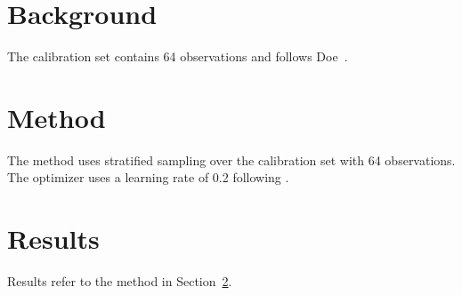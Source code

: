 \documentclass{article}
\begin{document}
\section{Background}\label{sec:background}
The calibration set contains 64 observations and follows Doe~\cite{doe2024}.

\section{Method}\label{sec:method}
The method uses stratified sampling over the calibration set with 64 observations.
The optimizer uses a learning rate of 0.2 following \cite{doe2024}.
\section{Results}\label{sec:results}
Results refer to the method in Section~\ref{sec:method}.
\end{document}
